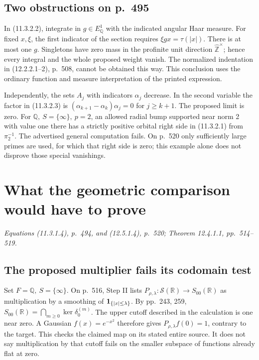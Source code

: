 \documentclass[11pt,reqno]{amsart}
\numberwithin{equation}{section}
\newcommand{\Q}{\mathbb Q}\newcommand{\R}{\mathbb R}\newcommand{\C}{\mathbb C}\newcommand{\Z}{\mathbb Z}
\begin{document}
\subsection*{Two obstructions on p.~495}
In (11.3.2.2), integrate in \(g\in E_\Q^1\) with the indicated angular Haar measure. For fixed \(x,\xi\), the first indicator of the section requires \(\xi gx=\tau(|x|)\). There is at most one \(g\). Singletons have zero mass in the profinite unit direction \(\widehat{\Z}^{\times}\); hence every integral and the whole proposed weight vanish. The normalized indentation in (12.2.2.1--2), p.~508, cannot be obtained this way. This conclusion uses the ordinary function and measure interpretation of the printed expression.

Independently, the sets \(A_j\) with indicators \(\alpha_j\) decrease. In the second variable the factor in (11.3.2.3) is \((\alpha_{k+1}-\alpha_k)\alpha_j=0\) for \(j\ge k+1\). The proposed limit is zero. For \(\Q,\ S=\{\infty\},\ p=2\), an allowed radial bump supported near norm 2 with value one there has a strictly positive orbital right side in (11.3.2.1) from \(\pi_2^{-1}\). The advertised general computation fails. On p.~520 only sufficiently large primes are used, for which that right side is zero; this example alone does not disprove those special vanishings.


\section{What the geometric comparison would have to prove}\label{sec:9}

\textit{Equations (11.3.1.4), p.~494, and (12.5.1.4), p.~520; Theorem 12.4.1.1, pp.~514--519.}\par
\subsection*{The proposed multiplier fails its codomain test}
Set \(F=\Q,\ S=\{\infty\}\). On p.~516, Step II lists \(P_{\rho,\lambda}:\mathcal S(\R)\to S_{00}(\R)\) as multiplication by a smoothing of \(\mathbf1_{\{|x|\le\lambda\}}\). By pp.~243, 259, \(S_{00}(\R)=\bigcap_{m\ge0}\ker\delta_0^{(m)}\). The upper cutoff described in the calculation is one near zero. A Gaussian \(f(x)=e^{-x^2}\) therefore gives \(P_{\rho,\lambda}f(0)=1\), contrary to the target. This checks the claimed map on its stated entire source. It does not say multiplication by that cutoff fails on the smaller subspace of functions already flat at zero.
\end{document}
